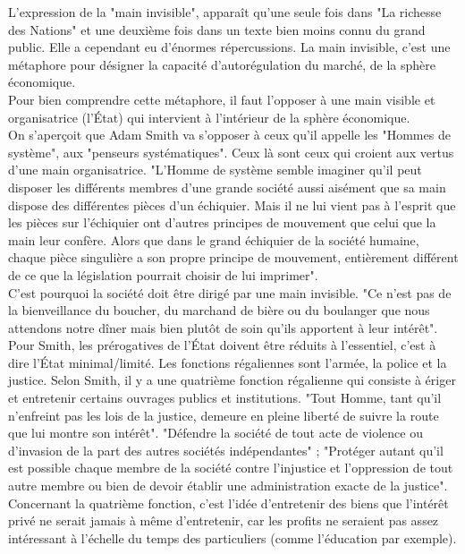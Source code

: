 \documentclass[10pt, a4paper, openany]{book}
\begin{document}
L'expression de la "main invisible", apparaît qu'une seule fois dans "La richesse des Nations" et une deuxième fois dans un texte bien moins connu du grand public. Elle a cependant eu d'énormes répercussions. La main invisible, c'est une métaphore pour désigner la capacité d'autorégulation du marché, de la sphère économique. \\
Pour bien comprendre cette métaphore, il faut l'opposer à une main visible et organisatrice (l'État) qui intervient à l'intérieur de la sphère économique. \\
On s'aperçoit que Adam Smith va s'opposer à ceux qu'il appelle les "Hommes de système", aux "penseurs systématiques". Ceux là sont ceux qui croient aux vertus d'une main organisatrice. "L'Homme de système semble imaginer qu'il peut disposer les différents membres d'une grande société aussi aisément que sa main dispose des différentes pièces d'un échiquier. Mais il ne lui vient pas à l'esprit que les pièces sur l'échiquier ont d'autres principes de mouvement que celui que la main leur confère. Alors que dans le grand échiquier de la société humaine, chaque pièce singulière a son propre principe de mouvement, entièrement différent de ce que la législation pourrait choisir de lui imprimer". \\
C'est pourquoi la société doit être dirigé par une main invisible. "Ce n'est pas de la bienveillance du boucher, du marchand de bière ou du boulanger que nous attendons notre dîner mais bien plutôt de soin qu'ils apportent à leur intérêt". \\
Pour Smith, les prérogatives de l'État doivent être réduits à l'essentiel, c'est à dire l'État minimal/limité. Les fonctions régaliennes sont l'armée, la police et la justice. Selon Smith, il y a une quatrième fonction régalienne qui consiste à ériger et entretenir certains ouvrages publics et institutions. "Tout Homme, tant qu'il n'enfreint pas les lois de la justice, demeure en pleine liberté de suivre la route que lui montre son intérêt". "Défendre la société de tout acte de violence ou d'invasion de la part des autres sociétés indépendantes" ; "Protéger autant qu'il est possible chaque membre de la société contre l'injustice et l'oppression de tout autre membre ou bien de devoir établir une administration exacte de la justice". Concernant la quatrième fonction, c'est l'idée d'entretenir des biens que l'intérêt privé ne serait jamais à même d'entretenir, car les profits ne seraient pas assez intéressant à l'échelle du temps des particuliers (comme l'éducation par exemple). 
\end{document}
